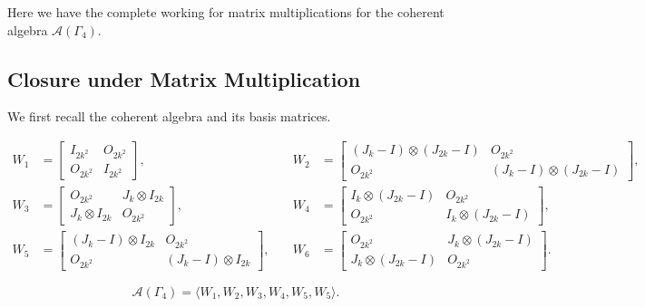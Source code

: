 Here we have the complete working for matrix multiplications for the coherent algebra $\mathcal{A}(\Gamma_4)$.

\subsection*{Closure under Matrix Multiplication}\label{working:gamma-4}
We first recall the coherent algebra and its basis matrices.

\[
\begin{aligned}
W_1 &= 
\begin{bmatrix}
I_{2k^2} & O_{2k^2} \\
O_{2k^2} & I_{2k^2}
\end{bmatrix},
& \quad
W_2 &= 
\begin{bmatrix}
(J_k - I) \otimes (J_{2k} - I) & O_{2k^2} \\
O_{2k^2} & (J_k - I) \otimes (J_{2k} - I)
\end{bmatrix}, \\[1em]
W_3 &= 
\begin{bmatrix}
O_{2k^2} & J_k \otimes I_{2k} \\
J_k \otimes I_{2k} & O_{2k^2}
\end{bmatrix},
& \quad
W_4 &= 
\begin{bmatrix}
I_k \otimes (J_{2k} - I) & O_{2k^2} \\
O_{2k^2} & I_k \otimes (J_{2k} - I)
\end{bmatrix}, \\[1em]
W_5 &= 
\begin{bmatrix}
(J_k - I) \otimes I_{2k} & O_{2k^2} \\
O_{2k^2} & (J_k - I) \otimes I_{2k}
\end{bmatrix},
& \quad
W_6 &= 
\begin{bmatrix}
O_{2k^2} & J_k \otimes (J_{2k} - I) \\
J_k \otimes (J_{2k} - I) & O_{2k^2}
\end{bmatrix}.
\end{aligned}
\]

\begin{equation*}
    \mathcal{A}(\Gamma_4) = \langle W_1,W_2,W_3,W_4,W_5,W_5\rangle.
\end{equation*}

